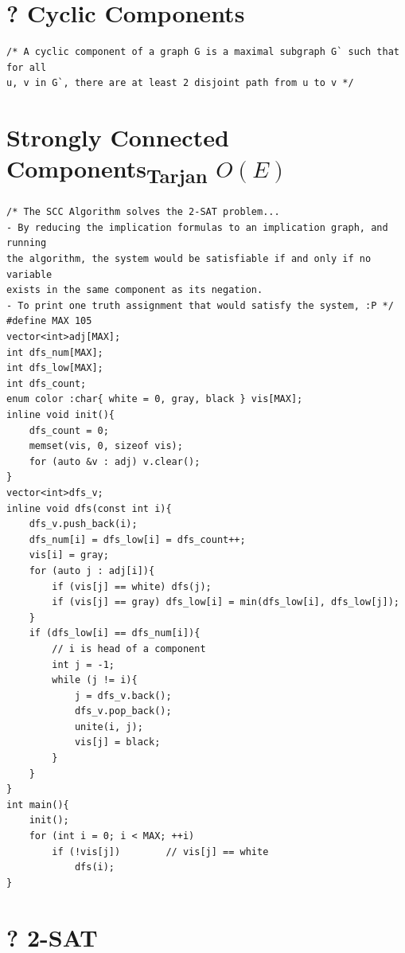 \documentclass[12pt]{book}
\begin{document}
\section{? Cyclic Components}
\begin{verbatim}
/* A cyclic component of a graph G is a maximal subgraph G` such that for all
u, v in G`, there are at least 2 disjoint path from u to v */
\end{verbatim}
\section{Strongly Connected Components\textsubscript {Tarjan} $O(E)$}
\begin{verbatim}
/* The SCC Algorithm solves the 2-SAT problem...
- By reducing the implication formulas to an implication graph, and running
the algorithm, the system would be satisfiable if and only if no variable
exists in the same component as its negation.
- To print one truth assignment that would satisfy the system, :P */
#define MAX 105
vector<int>adj[MAX];
int dfs_num[MAX];
int dfs_low[MAX];
int dfs_count;
enum color :char{ white = 0, gray, black } vis[MAX];
inline void init(){
	dfs_count = 0;
	memset(vis, 0, sizeof vis);
	for (auto &v : adj) v.clear();
}
vector<int>dfs_v;
inline void dfs(const int i){
	dfs_v.push_back(i);
	dfs_num[i] = dfs_low[i] = dfs_count++;
	vis[i] = gray;
	for (auto j : adj[i]){
		if (vis[j] == white) dfs(j);
		if (vis[j] == gray) dfs_low[i] = min(dfs_low[i], dfs_low[j]);
	}
	if (dfs_low[i] == dfs_num[i]){
		// i is head of a component
		int j = -1;
		while (j != i){
			j = dfs_v.back();
			dfs_v.pop_back();
			unite(i, j);
			vis[j] = black;
		}
	}
}
int main(){
	init();
	for (int i = 0; i < MAX; ++i)
		if (!vis[j])		// vis[j] == white
			dfs(i);
}
\end{verbatim}
\section{? 2-SAT}
\end{document}
